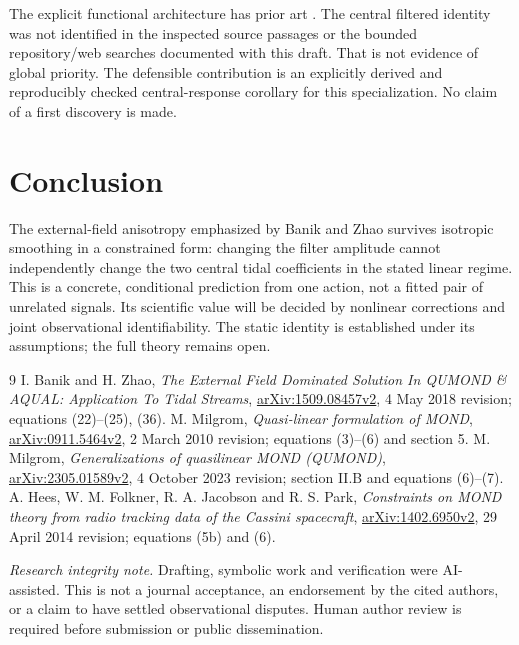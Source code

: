 \documentclass[11pt,letterpaper]{article}
\begin{document}
The explicit functional architecture has prior art \cite{gqumond}. The central
filtered identity was not identified in the inspected source passages or the
bounded repository/web searches documented with this draft. That is not
evidence of global priority. The defensible contribution is an explicitly
derived and reproducibly checked central-response corollary for this
specialization. No claim of a first discovery is made.

\section{Conclusion}
The external-field anisotropy emphasized by Banik and Zhao survives isotropic
smoothing in a constrained form: changing the filter amplitude cannot
independently change the two central tidal coefficients in the stated linear
regime. This is a concrete, conditional prediction from one action, not a
fitted pair of unrelated signals. Its scientific value will be decided by
nonlinear corrections and joint observational identifiability. The static
identity is established under its assumptions; the full theory remains open.

\begin{thebibliography}{9}
I. Banik and H. Zhao,
\emph{The External Field Dominated Solution In QUMOND \& AQUAL:
Application To Tidal Streams},
\href{https://arxiv.org/pdf/1509.08457v2}{arXiv:1509.08457v2},
4 May 2018 revision; equations (22)--(25), (36).
M. Milgrom, \emph{Quasi-linear formulation of MOND},
\href{https://arxiv.org/pdf/0911.5464v2}{arXiv:0911.5464v2},
2 March 2010 revision; equations (3)--(6) and section 5.
M. Milgrom, \emph{Generalizations of quasilinear MOND (QUMOND)},
\href{https://arxiv.org/pdf/2305.01589v2}{arXiv:2305.01589v2},
4 October 2023 revision; section II.B and equations (6)--(7).
A. Hees, W. M. Folkner, R. A. Jacobson and R. S. Park,
\emph{Constraints on MOND theory from radio tracking data of the Cassini
spacecraft}, \href{https://arxiv.org/pdf/1402.6950v2}{arXiv:1402.6950v2},
29 April 2014 revision; equations (5b) and (6).
\end{thebibliography}
\small\textit{Research integrity note.} Drafting, symbolic work and verification
were AI-assisted. This is not a journal acceptance, an endorsement by the
cited authors, or a claim to have settled observational disputes. Human
author review is required before submission or public dissemination.
\end{document}
